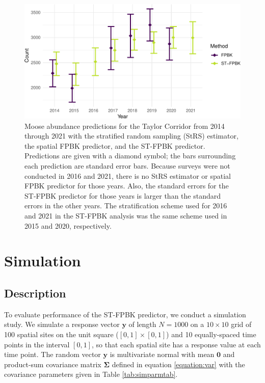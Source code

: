 \documentclass[smallextended]{svjour3}       %
\begin{document}
\begin{figure}
\centering
\includegraphics{preprint_springer_files/figure-latex/unnamed-chunk-11-1.pdf}
\caption{\label{fig:trend} Moose abundance predictions for the Taylor
Corridor from 2014 through 2021 with the stratified random sampling
(StRS) estimator, the spatial FPBK predictor, and the ST-FPBK predictor.
Predictions are given with a diamond symbol; the bars surrounding each
prediction are standard error bars. Because surveys were not conducted
in 2016 and 2021, there is no StRS estimator or spatial FPBK predictor
for those years. Also, the standard errors for the ST-FPBK predictor for
those years is larger than the standard errors in the other years. The
stratification scheme used for 2016 and 2021 in the ST-FPBK analysis was
the same scheme used in 2015 and 2020, respectively.}
\end{figure}

\hypertarget{section:Simulation}{%
\section{Simulation}\label{section:Simulation}}

\hypertarget{description}{%
\subsection{Description}\label{description}}

To evaluate performance of the ST-FPBK predictor, we conduct a
simulation study. We simulate a response vector \(\mathbf{y}\) of length
\(N = 1000\) on a \(10 \times 10\) grid of 100 spatial sites on the unit
square (\([0, 1] \times [0, 1]\)) and 10 equally-spaced time points in
the interval \([0, 1]\), so that each spatial site has a response value
at each time point. The random vector \(\mathbf{y}\) is multivariate
normal with mean \(\mathbf{0}\) and product-sum covariance matrix
\(\bm{\Sigma}\) defined in equation \ref{equation:var} with the
covariance parameters given in Table \ref{tab:simparmtab}.
\end{document}
